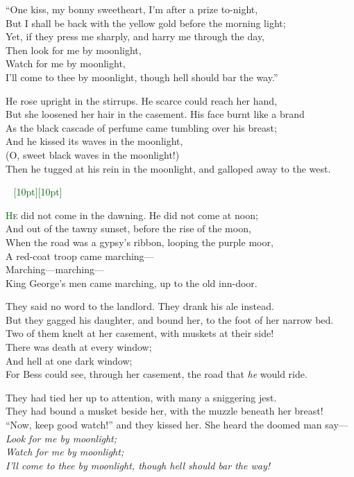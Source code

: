 \documentclass[oneside,12pt,english]{book}
\newcommand*\initfamily{\usefont{U}{Acorn}{xl}{n}}
\newcommand{\ornamento}{\vspace{2em}\noindent \textcolor{darkgreen}{\hrulefill~ \raisebox{-2.5pt}[10pt][10pt]{\leafright \decofourleft \decothreeleft  \aldineright \decotwo \floweroneleft \decoone   \floweroneright \decotwo \aldineleft\decothreeright \decofourright \leafleft} ~  \hrulefill \\ \vspace{2em}}}
\begin{document}
``One kiss, my bonny sweetheart, I’m after a prize to-night,\\
But I shall be back with the yellow gold before the morning light;\\
Yet, if they press me sharply, and harry me through the day,\\
Then look for me by moonlight,\\
Watch for me by moonlight,\\
I’ll come to thee by moonlight, though hell should bar the way.''


He rose upright in the stirrups. He scarce could reach her hand,\\
But she loosened her hair in the casement. His face burnt like a brand\\
As the black cascade of perfume came tumbling over his breast;\\
And he kissed its waves in the moonlight,\\
(O, sweet black waves in the moonlight!)\\
Then he tugged at his rein in the moonlight, and galloped away to the west.

\ornamento
\pagebreak


\lettrine[lines=3]{\initfamily\textcolor{darkgreen}{H}}{e} did not come in the
dawning. He did not come at noon;\\
And out of the tawny sunset, before the rise of the moon,\\
When the road was a gypsy’s ribbon, looping the purple moor,\\
A red-coat troop came marching---\\
Marching---marching---\\
King George’s men came marching, up to the old inn-door.


They said no word to the landlord. They drank his ale instead.\\
But they gagged his daughter, and bound her, to the foot of her narrow bed.\\
Two of them knelt at her casement, with muskets at their side!\\
There was death at every window;\\
And hell at one dark window;\\
For Bess could see, through her casement, the road that \textit{he} would ride.


They had tied her up to attention, with many a sniggering jest.\\
They had bound a musket beside her, with the muzzle beneath her breast!\\
``Now, keep good watch!'' and they kissed her. She heard the doomed man say---\\
\textit{Look for me by moonlight;\\
Watch for me by moonlight;\\
I’ll come to thee by moonlight, though hell should bar the way!}
\end{document}
